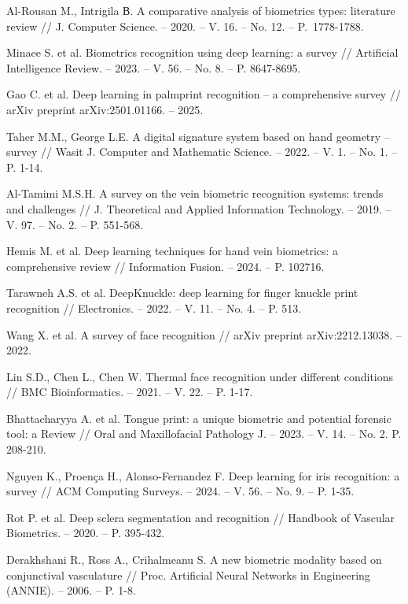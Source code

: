 \documentclass[12pt]{book}
\begin{document}
{\begin{thebibliography}{11}
     Al-Rousan M., Intrigila В. A comparative analysis of biometrics types: literature review // J. Computer Science. -- 2020. -- V. 16. -- No. 12. -- P.~1778-1788. 

     Minaee S. et al. Biometrics recognition using deep learning: a survey // Artificial Intelligence Review. -- 2023. -- V. 56. -- No. 8. -- P. 8647-8695.

     Gao C. et al. Deep learning in palmprint recognition -- a comprehensive survey // arXiv preprint arXiv:2501.01166. -- 2025.

     Taher M.M., George L.E. A digital signature system based on hand geometry -- survey // Wasit J. Computer and Mathematic Science. -- 2022. -- V. 1. -- No. 1. -- P. 1-14.

     Al-Tamimi M.S.H. A survey on the vein biometric recognition systems: trends and challenges // J. Theoretical and Applied Information Technology. -- 2019. -- V. 97. -- No. 2. -- P. 551-568.

     Hemis M. et al. Deep learning techniques for hand vein biometrics: a comprehensive review // Information Fusion. -- 2024. -- P. 102716.

     Tarawneh A.S. et al. DeepKnuckle: deep learning for finger knuckle print recognition // Electronics. -- 2022. -- V. 11. -- No. 4. -- P. 513.

     Wang X. et al. A survey of face recognition // arXiv preprint arXiv:2212.13038. -- 2022.

     Lin S.D., Chen L., Chen W. Thermal face recognition under different conditions // BMC Bioinformatics. -- 2021. -- V. 22. -- P. 1-17.

     Bhattacharyya A. et al. Tongue print: a unique biometric and potential forensic tool: a Review // Oral and Maxillofacial Pathology J. -- 2023. -- V. 14. -- No. 2. P. 208-210.

     Nguyen K., Proença H., Alonso-Fernandez F. Deep learning for iris recognition: a survey // ACM Computing Surveys. -- 2024. -- V. 56. -- No. 9. -- P. 1-35.

     Rot P. et al. Deep sclera segmentation and recognition // Handbook of Vascular Biometrics. -- 2020. -- P. 395-432.

     Derakhshani R., Ross A., Crihalmeanu S. A new biometric modality based on conjunctival vasculature // Proc. Artificial Neural Networks in Engineering (ANNIE). -- 2006. -- P. 1-8.


\end{thebibliography}}
\end{document}
